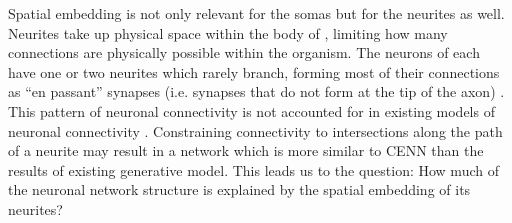 Spatial embedding is not only relevant for the somas but for the neurites as well. 
Neurites take up physical space within the body of \ce, limiting how many connections are physically possible within the organism. 
The neurons of \ce each have one or two neurites which rarely branch, forming most of their connections as “en passant” synapses (i.e. synapses that do not form at the tip of the axon) \citep{Durbin,White}. 
This pattern of neuronal connectivity is not accounted for in existing models of \ce neuronal connectivity \citep{Costa,Itzhack,Khajezade,Nicosia}. 
Constraining connectivity to intersections along the path of a neurite may result in a network which is more similar to CENN than the results of existing generative model. 
This leads us to the question: How much of the \ce neuronal network structure is explained by the spatial embedding of its neurites?
